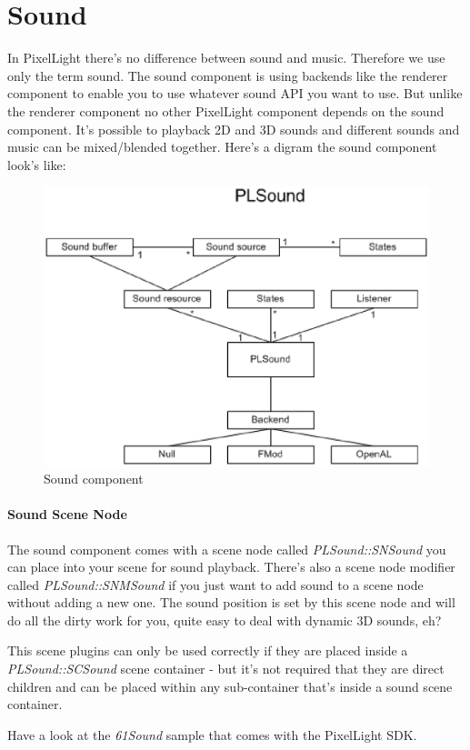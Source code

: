 \section{Sound}
In PixelLight there's no difference between sound and music. Therefore we use only the term sound. The sound component is using backends like the renderer component to enable you to use whatever sound API you want to use. But unlike the renderer component no other PixelLight component depends on the sound component. It's possible to playback 2D and 3D sounds and different sounds and music can be mixed/blended together. Here's a digram the sound component look's like:\\
\begin{figure}
  \begin{center}
    \includegraphics{pics/PLSoundClassDiagram.eps}
  \end{center}
  \caption{Sound component}
  \label{fig:Sound component high-level UML class diagram}
\end{figure}


\paragraph{Sound Scene Node}
The sound component comes with a scene node called \emph{PLSound::SNSound} you can place into your scene for sound playback. There's also a scene node modifier called \emph{PLSound::SNMSound} if you just want to add sound to a scene node without adding a new one. The sound position is set by this scene node and will do all the dirty work for you, quite easy to deal with dynamic 3D sounds, eh?

This scene plugins can only be used correctly if they are placed inside a \emph{PLSound::SCSound} scene container - but it's not required that they are direct children and can be placed within any sub-container that's inside a sound scene container.

Have a look at the \emph{61Sound} sample that comes with the PixelLight SDK.
